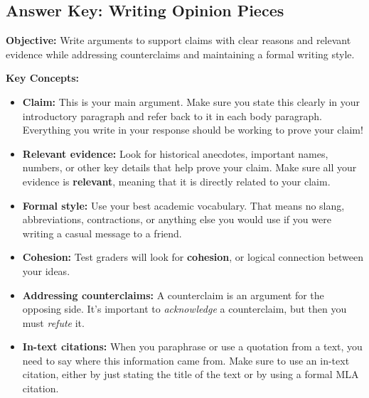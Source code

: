 \documentclass[12pt]{article}
\begin{document}
\subsection*{Answer Key: Writing Opinion Pieces}
\onehalfspacing

\begin{tcolorbox}[colframe=black!40, colback=gray!5, 
coltitle=black, colbacktitle=black!20, fonttitle=\bfseries\Large, 
title=Learning Objective, halign title=center, left=5pt, right=5pt, top=5pt, bottom=15pt]
\textbf{Objective:} Write arguments to support claims with clear reasons and relevant evidence while addressing counterclaims and maintaining a formal writing style.
\end{tcolorbox}

\vspace{1em}

\begin{tcolorbox}[colframe=black!60, colback=white, 
coltitle=black, colbacktitle=black!15, fonttitle=\bfseries\Large, 
title=Key Concepts and Vocabulary, halign title=center, left=10pt, right=10pt, top=10pt, bottom=15pt]
\textbf{Key Concepts:}
\begin{itemize}
    \item \textbf{Claim:} This is your main argument. Make sure you state this clearly in your introductory paragraph and refer back to it in each body paragraph. Everything you write in your response should be working to prove your claim!
    \item \textbf{Relevant evidence:} Look for historical anecdotes, important names, numbers, or other key details that help prove your claim. Make sure all your evidence is \textbf{relevant}, meaning that it is directly related to your claim. 
    \item \textbf{Formal style:} Use your best academic vocabulary. That means no slang, abbreviations, contractions, or anything else you would use if you were writing a casual message to a friend. 
    \item \textbf{Cohesion:} Test graders will look for \textbf{cohesion}, or logical connection between your ideas. 
    \item \textbf{Addressing counterclaims:} A counterclaim is an argument for the opposing side. It's important to \textit{acknowledge} a counterclaim, but then you must \textit{refute} it.
    \item \textbf{In-text citations:} When you paraphrase or use a quotation from a text, you need to say where this information came from. Make sure to use an in-text citation, either by just stating the title of the text or by using a formal MLA citation.
\end{itemize}
\end{tcolorbox}
\end{document}
